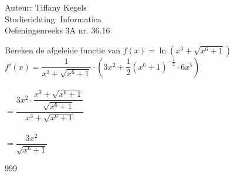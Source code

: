 \documentclass[a4paper]{article}
\begin{document}
  
\noindent \large Auteur: Tiffany Kegels \\
\noindent \large Studierichting: Informatica\\
\noindent \large Oefeningenreeks 3A nr. 36.16\\

\medskip

\normalsize

Bereken de afgeleide functie van $f(x) = \ln (x^3 + \sqrt{x^6 + 1})$\\

$f'(x) = \dfrac{1}{x^3 + \sqrt{x^6 + 1}} \cdot \left( 3x^2 + \dfrac{1}{2}(x^6 + 1)^{-\tfrac{1}{2}} \cdot 6x^5 \right)$\\\\

$= \dfrac{3x^2 \cdot \dfrac{x^3 + \sqrt{x^6 + 1}}{\sqrt{x^6 +1}}}{x^3 + \sqrt{x^6 + 1}}$\\\\

$= \dfrac{3x^2}{\sqrt{x^6 +1}}$\\

\begin{thebibliography}{999}

\end{thebibliography}
\end{document}
